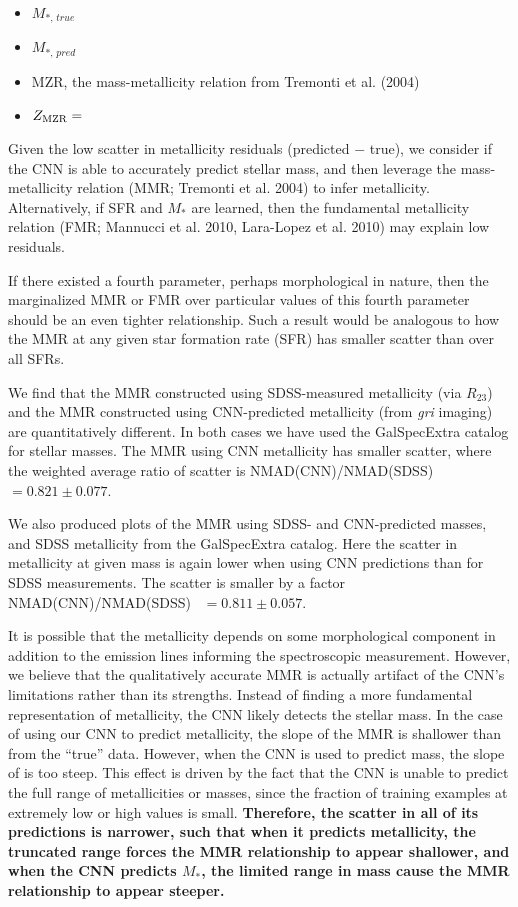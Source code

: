 \documentclass[fleqn,usenatbib]{mnras}
\begin{document}
\begin{itemize}
	\item $M_{\ast,\,true}$
	\item $M_{\ast,\,pred}$
	\item MZR, the mass-metallicity relation from Tremonti et al. (2004)
	\item $Z_{\rm MZR} = $
\end{itemize}

Given the low scatter in metallicity residuals (predicted $-$ true), we consider if the CNN is able to accurately predict stellar mass, and then leverage the mass-metallicity relation (MMR; Tremonti et al. 2004) to infer metallicity.
Alternatively, if SFR and $M_*$ are learned, then the fundamental metallicity relation (FMR; Mannucci et al. 2010, Lara-Lopez et al. 2010) may explain low residuals.

If there existed a fourth parameter, perhaps morphological in nature, then the marginalized MMR or FMR over particular values of this fourth parameter should be an even tighter relationship.
Such a result would be analogous to how the MMR at any given star formation rate (SFR) has smaller scatter than over all SFRs.

We find that the MMR constructed using SDSS-measured metallicity (via $R_{23}$) and the MMR constructed using CNN-predicted metallicity (from \textit{gri} imaging) are quantitatively different.
In both cases we have used the GalSpecExtra catalog for stellar masses.
The MMR using CNN metallicity has smaller scatter, where the weighted average ratio of scatter is NMAD(CNN)/NMAD(SDSS)~$= 0.821 \pm 0.077$.


We also produced plots of the MMR using SDSS- and CNN-predicted masses, and SDSS metallicity from the GalSpecExtra catalog.
Here the scatter in metallicity at given mass is again lower when using CNN predictions than for SDSS measurements.
The scatter is smaller by a factor NMAD(CNN)/NMAD(SDSS)~ $= 0.811 \pm 0.057$.

It is possible that the metallicity depends on some morphological component in addition to the emission lines informing the spectroscopic measurement.
However, we believe that the qualitatively accurate MMR is actually artifact of the CNN's limitations rather than its strengths.
Instead of finding a more fundamental representation of metallicity, the CNN likely detects the stellar mass.
In the case of using our CNN to predict metallicity, the slope of the MMR is shallower than from the ``true'' data. 
However, when the CNN is used to predict mass, the slope of is too steep.
This effect is driven by the fact that the CNN is unable to predict the full range of metallicities or masses, since the fraction of training examples at extremely low or high values is small.
\textbf{Therefore, the scatter in all of its predictions is narrower, such that when it predicts metallicity, the truncated range forces the MMR relationship to appear shallower, and when the CNN predicts $M_*$, the limited range in mass cause the MMR relationship to appear steeper.}
\end{document}
